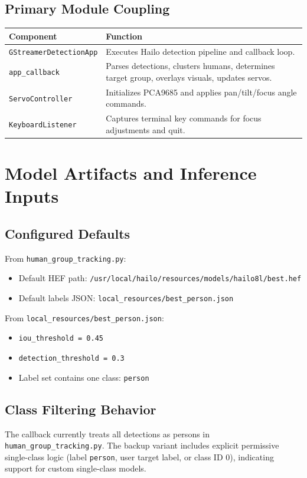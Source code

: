 \documentclass[11pt,a4paper]{article}
\begin{document}
\subsection{Primary Module Coupling}
\begin{longtable}{>{\raggedright\arraybackslash}p{} p{}}
\toprule
\textbf{Component} & \textbf{Function} \\
\midrule
\texttt{GStreamerDetectionApp} & Executes Hailo detection pipeline and callback loop. \\
\texttt{app\_callback} & Parses detections, clusters humans, determines target group, overlays visuals, updates servos. \\
\texttt{ServoController} & Initializes PCA9685 and applies pan/tilt/focus angle commands. \\
\texttt{KeyboardListener} & Captures terminal key commands for focus adjustments and quit. \\
\bottomrule
\end{longtable}

\section{Model Artifacts and Inference Inputs}
\subsection{Configured Defaults}
From \texttt{human\_group\_tracking.py}:
\begin{itemize}[leftmargin=*]
  \item Default HEF path: \texttt{/usr/local/hailo/resources/models/hailo8l/best.hef}
  \item Default labels JSON: \texttt{local\_resources/best\_person.json}
\end{itemize}

From \texttt{local\_resources/best\_person.json}:
\begin{itemize}[leftmargin=*]
  \item \texttt{iou\_threshold = 0.45}
  \item \texttt{detection\_threshold = 0.3}
  \item Label set contains one class: \texttt{person}
\end{itemize}

\subsection{Class Filtering Behavior}
The callback currently treats all detections as persons in \texttt{human\_group\_tracking.py}. The backup variant includes explicit permissive single-class logic (label \texttt{person}, user target label, or class ID 0), indicating support for custom single-class models.
\end{document}
